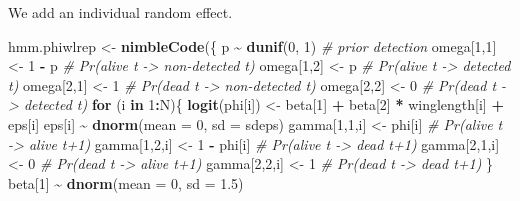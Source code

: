 \documentclass[
  12pt,
]{krantz}
\newenvironment{Shaded}{\begin{snugshade}}{\end{snugshade}}
\newcommand{\AttributeTok}[1]{\textcolor[rgb]{0.13,0.29,0.53}{#1}}
\newcommand{\CommentTok}[1]{\textcolor[rgb]{0.56,0.35,0.01}{\textit{#1}}}
\newcommand{\ControlFlowTok}[1]{\textcolor[rgb]{0.13,0.29,0.53}{\textbf{#1}}}
\newcommand{\DecValTok}[1]{\textcolor[rgb]{0.00,0.00,0.81}{#1}}
\newcommand{\FloatTok}[1]{\textcolor[rgb]{0.00,0.00,0.81}{#1}}
\newcommand{\FunctionTok}[1]{\textcolor[rgb]{0.13,0.29,0.53}{\textbf{#1}}}
\newcommand{\NormalTok}[1]{#1}
\newcommand{\OtherTok}[1]{\textcolor[rgb]{0.56,0.35,0.01}{#1}}
\newcommand{\SpecialCharTok}[1]{\textcolor[rgb]{0.81,0.36,0.00}{\textbf{#1}}}
\begin{document}
We add an individual random effect.

\begin{Shaded}
\begin{Highlighting}[]
\NormalTok{hmm.phiwlrep }\OtherTok{\textless{}{-}} \FunctionTok{nimbleCode}\NormalTok{(\{}
\NormalTok{    p }\SpecialCharTok{\textasciitilde{}} \FunctionTok{dunif}\NormalTok{(}\DecValTok{0}\NormalTok{, }\DecValTok{1}\NormalTok{) }\CommentTok{\# prior detection}
\NormalTok{    omega[}\DecValTok{1}\NormalTok{,}\DecValTok{1}\NormalTok{] }\OtherTok{\textless{}{-}} \DecValTok{1} \SpecialCharTok{{-}}\NormalTok{ p    }\CommentTok{\# Pr(alive t {-}\textgreater{} non{-}detected t)}
\NormalTok{    omega[}\DecValTok{1}\NormalTok{,}\DecValTok{2}\NormalTok{] }\OtherTok{\textless{}{-}}\NormalTok{ p        }\CommentTok{\# Pr(alive t {-}\textgreater{} detected t)}
\NormalTok{    omega[}\DecValTok{2}\NormalTok{,}\DecValTok{1}\NormalTok{] }\OtherTok{\textless{}{-}} \DecValTok{1}        \CommentTok{\# Pr(dead t {-}\textgreater{} non{-}detected t)}
\NormalTok{    omega[}\DecValTok{2}\NormalTok{,}\DecValTok{2}\NormalTok{] }\OtherTok{\textless{}{-}} \DecValTok{0}        \CommentTok{\# Pr(dead t {-}\textgreater{} detected t)}
  \ControlFlowTok{for}\NormalTok{ (i }\ControlFlowTok{in} \DecValTok{1}\SpecialCharTok{:}\NormalTok{N)\{}
    \FunctionTok{logit}\NormalTok{(phi[i]) }\OtherTok{\textless{}{-}}\NormalTok{ beta[}\DecValTok{1}\NormalTok{] }\SpecialCharTok{+}\NormalTok{ beta[}\DecValTok{2}\NormalTok{] }\SpecialCharTok{*}\NormalTok{ winglength[i] }\SpecialCharTok{+}\NormalTok{ eps[i]}
\NormalTok{    eps[i] }\SpecialCharTok{\textasciitilde{}} \FunctionTok{dnorm}\NormalTok{(}\AttributeTok{mean =} \DecValTok{0}\NormalTok{, }\AttributeTok{sd =}\NormalTok{ sdeps)}
\NormalTok{    gamma[}\DecValTok{1}\NormalTok{,}\DecValTok{1}\NormalTok{,i] }\OtherTok{\textless{}{-}}\NormalTok{ phi[i]      }\CommentTok{\# Pr(alive t {-}\textgreater{} alive t+1)}
\NormalTok{    gamma[}\DecValTok{1}\NormalTok{,}\DecValTok{2}\NormalTok{,i] }\OtherTok{\textless{}{-}} \DecValTok{1} \SpecialCharTok{{-}}\NormalTok{ phi[i]  }\CommentTok{\# Pr(alive t {-}\textgreater{} dead t+1)}
\NormalTok{    gamma[}\DecValTok{2}\NormalTok{,}\DecValTok{1}\NormalTok{,i] }\OtherTok{\textless{}{-}} \DecValTok{0}           \CommentTok{\# Pr(dead t {-}\textgreater{} alive t+1)}
\NormalTok{    gamma[}\DecValTok{2}\NormalTok{,}\DecValTok{2}\NormalTok{,i] }\OtherTok{\textless{}{-}} \DecValTok{1}           \CommentTok{\# Pr(dead t {-}\textgreater{} dead t+1)}
\NormalTok{  \}}
\NormalTok{  beta[}\DecValTok{1}\NormalTok{] }\SpecialCharTok{\textasciitilde{}} \FunctionTok{dnorm}\NormalTok{(}\AttributeTok{mean =} \DecValTok{0}\NormalTok{, }\AttributeTok{sd =} \FloatTok{1.5}\NormalTok{)}

\end{Highlighting}
\end{Shaded}
\end{document}
